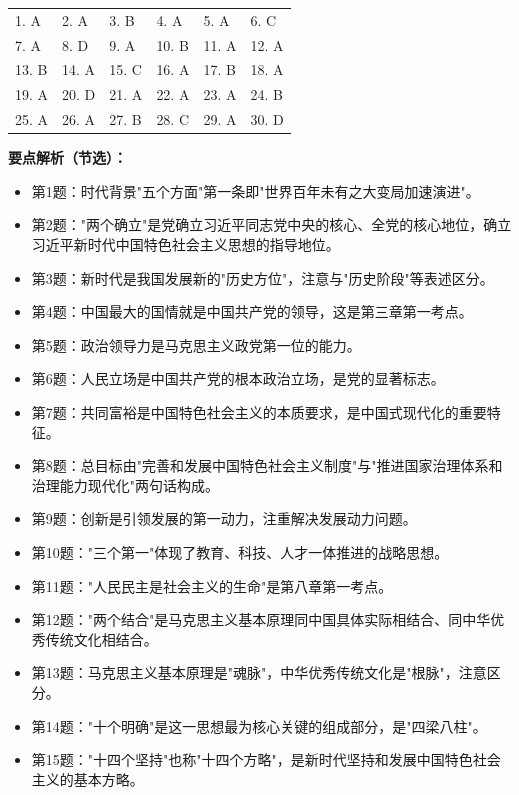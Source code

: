 \documentclass[12pt, a4paper]{article}
\begin{document}
\begin{answerbox}

\begin{tabular}{@{}llllll@{}}
1. A & 2. A & 3. B & 4. A & 5. A & 6. C \\
7. A & 8. D & 9. A & 10. B & 11. A & 12. A \\
13. B & 14. A & 15. C & 16. A & 17. B & 18. A \\
19. A & 20. D & 21. A & 22. A & 23. A & 24. B \\
25. A & 26. A & 27. B & 28. C & 29. A & 30. D \\
\end{tabular}

\vspace{6pt}
\textbf{要点解析（节选）：}

\begin{itemize}[leftmargin=2em,itemsep=2pt]
  \item 第1题：时代背景"五个方面"第一条即"世界百年未有之大变局加速演进"。
  \item 第2题："两个确立"是党确立习近平同志党中央的核心、全党的核心地位，确立习近平新时代中国特色社会主义思想的指导地位。
  \item 第3题：新时代是我国发展新的"历史方位"，注意与"历史阶段"等表述区分。
  \item 第4题：中国最大的国情就是中国共产党的领导，这是第三章第一考点。
  \item 第5题：政治领导力是马克思主义政党第一位的能力。
  \item 第6题：人民立场是中国共产党的根本政治立场，是党的显著标志。
  \item 第7题：共同富裕是中国特色社会主义的本质要求，是中国式现代化的重要特征。
  \item 第8题：总目标由"完善和发展中国特色社会主义制度"与"推进国家治理体系和治理能力现代化"两句话构成。
  \item 第9题：创新是引领发展的第一动力，注重解决发展动力问题。
  \item 第10题："三个第一"体现了教育、科技、人才一体推进的战略思想。
  \item 第11题："人民民主是社会主义的生命"是第八章第一考点。
  \item 第12题："两个结合"是马克思主义基本原理同中国具体实际相结合、同中华优秀传统文化相结合。
  \item 第13题：马克思主义基本原理是"魂脉"，中华优秀传统文化是"根脉"，注意区分。
  \item 第14题："十个明确"是这一思想最为核心关键的组成部分，是"四梁八柱"。
  \item 第15题："十四个坚持"也称"十四个方略"，是新时代坚持和发展中国特色社会主义的基本方略。

\end{itemize}
\end{answerbox}
\end{document}
